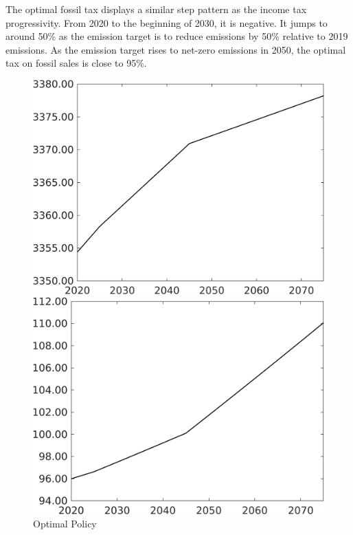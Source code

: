 The optimal fossil tax displays a similar step pattern as the income tax progressivity. From 2020 to the beginning of 2030, it is negative. It jumps to around 50\% as the emission target is to reduce emissions by 50\% relative to 2019 emissions. As the emission target rises  to net-zero emissions in 2050, the optimal tax on fossil sales is close to 95\%. 

\begin{figure}[h!!]
	\centering
	\caption{Optimal Policy }\label{fig:optAll}
	\begin{minipage}[]{0.32\textwidth}
		\includegraphics[width=1\textwidth]{../../codding_model/own_basedOnFried/optimalPol_elastS_DisuSci/figures/all_1705/Single_OPT_T_NoTaus_Af_spillover0_sep1_BN0_ineq0_etaa0.79.png}
	\end{minipage}
	\begin{minipage}[]{0.32\textwidth}
		\includegraphics[width=1\textwidth]{../../codding_model/own_basedOnFried/optimalPol_elastS_DisuSci/figures/all_1705/Single_OPT_T_NoTaus_Ag_spillover0_sep1_BN0_ineq0_etaa0.79.png}

\end{minipage}
\end{figure}
